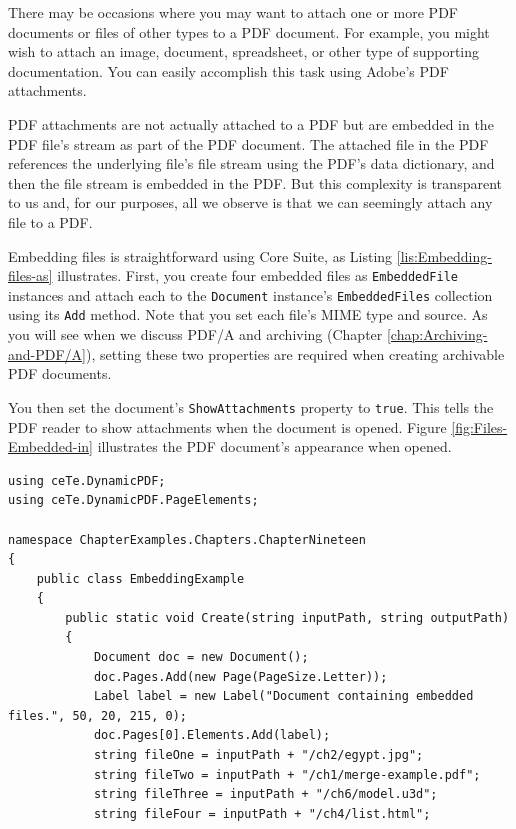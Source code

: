 \documentclass[american,letterpaper]{tufte-book}
\numberwithin{equation}{section}
\numberwithin{figure}{section}
\begin{document}
{{There may be occasions where you may want to attach one or more PDF
documents or files of other types to a PDF document. For example,
you might wish to attach an image, document, spreadsheet, or other
type of supporting documentation. You can easily accomplish this task
using Adobe's PDF attachments. 

PDF attachments are not actually attached to a PDF
but are embedded in the PDF file’s stream as part of the PDF document.
The \textquotedbl attached file\textquotedbl{} in the PDF references
the underlying file’s file stream using the PDF’s data dictionary,
and then the file stream is embedded in the PDF. But this complexity
is transparent to us and, for our purposes, all we observe is that
we can seemingly attach any file to a PDF.

Embedding files is straightforward using Core Suite, as Listing \ref{lis:Embedding-files-as}
illustrates. First, you create four embedded files as \texttt{EmbeddedFile}
instances and attach each to the \texttt{Document} instance's
\texttt{EmbeddedFiles} collection using its \texttt{Add} method. Note
that you set each file's MIME type and source. As you will see when
we discuss PDF/A and archiving (Chapter \ref{chap:Archiving-and-PDF/A}),
setting these two properties are required when creating archivable
PDF documents. 

You then set the document's \texttt{ShowAttachments} property to \texttt{true}.
This tells the PDF reader to show attachments when the document is
opened. Figure \ref{fig:Files-Embedded-in} illustrates the PDF document's
appearance when opened.

\bgroup{}
\begin{lstlisting}[caption={Embedding files as attachments.},label={lis:Embedding-files-as},basicstyle={\small\ttfamily},breaklines=true,showstringspaces=false]
using ceTe.DynamicPDF;
using ceTe.DynamicPDF.PageElements;

namespace ChapterExamples.Chapters.ChapterNineteen
{
    public class EmbeddingExample
    {
        public static void Create(string inputPath, string outputPath)
        {
            Document doc = new Document();
            doc.Pages.Add(new Page(PageSize.Letter));
            Label label = new Label("Document containing embedded files.", 50, 20, 215, 0);
            doc.Pages[0].Elements.Add(label);
            string fileOne = inputPath + "/ch2/egypt.jpg";
            string fileTwo = inputPath + "/ch1/merge-example.pdf";
            string fileThree = inputPath + "/ch6/model.u3d";
            string fileFour = inputPath + "/ch4/list.html";


\end{lstlisting}}}
\end{document}
